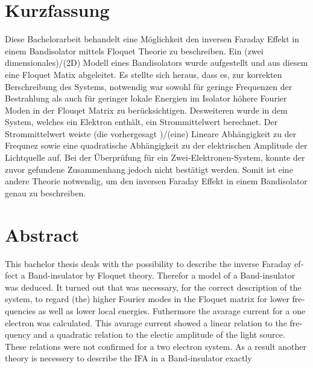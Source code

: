 \thispagestyle{plain}

\section*{Kurzfassung}
Diese Bachelorarbeit behandelt eine Möglichkeit
den inversen Faraday Effekt
in einem Bandisolator
mittels Floquet Theorie zu beschreiben.
Ein (zwei dimensionales)/(2D) Modell eines Bandisolators
wurde aufgestellt und aus diesem
eine Floquet Matix abgeleitet.
Es stellte sich heraus, dass es, zur
korrekten Berschreibung des Systems,
notwendig war
sowohl
für geringe Frequenzen der Bestrahlung
als auch für geringer lokale Energien
im Isolator
höhere Fourier Moden
in der Flouqet Matrix zu berücksichtigen.
Desweiteren wurde in dem System, welches
ein Elektron enthält, ein Strommittelwert
berechnet. Der Strommittelwert weiste
 (die vorhergesagt )/(eine)
Lineare Abhängigkeit
zu der Frequnez sowie eine quadratische Abhängigkeit
zu der elektrischen Amplitude der Lichtquelle auf.
Bei der Überprüfung für ein Zwei-Elektronen-System,
konnte der zuvor gefundene Zusammenhang
jedoch nicht bestätigt werden.
Somit ist eine andere Theorie notwendig,
um den inversen Faraday Effekt
in einem Bandisolator genau zu beschreiben.


\section*{Abstract}
\begin{english}
This bachelor thesis deals with the possibility to describe
the inverse Faraday effect a Band-insulator by Floquet theory.
Therefor a model of a Band-insulator was deduced.
It turned out that was necessary, for the
correct description of the system, to regard (the)
higher Fourier modes in the Floquet matrix  for lower frequencies
as well as lower local energies. Futhermore the
avarage current for a one electron was calculated.
This avarage current showed a linear relation to the
frequency and a quadratic relation to the electic amplitude
of the light source. These relations were not confirmed for a two
electron system.
As a result another theory is necessery to describe the IFA
in a Band-insulator exactly
\end{english}
